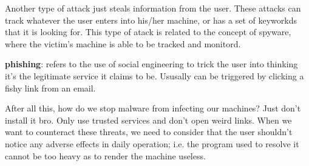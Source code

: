 \documentclass{article}
\begin{document}
Another type of attack just steals information from the user. These attacks can track whatever the user enters into his/her
machine, or has a set of keyworkds that it is looking for.  This type of atack is related to the concept of spyware, where
the victim's machine is able to be tracked and monitord.

\textbf{phishing}: refers to the use of social engineering to trick the user into thinking it's the legitimate service
it claims to be. Ususally can be triggered by clicking a fishy link from an email.

After all this, how do we stop malware from infecting our machines? Just don't install it bro.
Only use trusted services and don't open weird links. When we want to counteract these threats, we need to consider that
the user shouldn't notice any adverse effects in daily operation; i.e. the program used to resolve it cannot be too heavy
as to render the machine useless.
\end{document}
